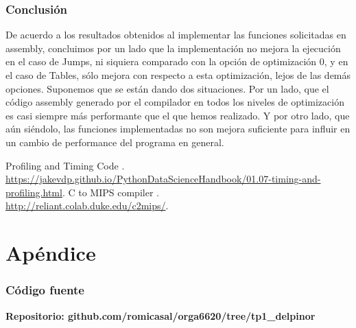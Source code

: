\documentclass[a4paper, 10pt, twoside, notitlepage]{article}
\begin{document}
\section{Conclusión}
De acuerdo a los resultados obtenidos al implementar las funciones solicitadas en assembly, concluimos por un lado que la implementación no mejora la ejecución en el caso de Jumps, ni siquiera comparado con la opción de optimización 0, y en el caso de Tables, sólo mejora con respecto a esta optimización, lejos de las demás opciones.
Suponemos que se están dando dos situaciones. Por un lado, que el código assembly generado por el compilador en todos los niveles de optimización es casi siempre más performante que el que hemos realizado. Y por otro lado, que aún siéndolo, las funciones implementadas no son mejora suficiente para influir en un cambio de performance del programa en general.

\vspace{.5cm}
\begin{thebibliography}{5}
 \bibitem{} Profiling and Timing Code
.\\ \url{https://jakevdp.github.io/PythonDataScienceHandbook/01.07-timing-and-profiling.html}.
 \bibitem{} C to MIPS compiler
.\\ \url{http://reliant.colab.duke.edu/c2mips/}.

\end{thebibliography}

\clearpage

\part{Apéndice}
\appendix

\normalsize
\section{Código fuente}\label{sec:codigofuente}

\textbf{Repositorio: github.com/romicasal/orga6620/tree/tp1\_delpinor}
\end{document}
